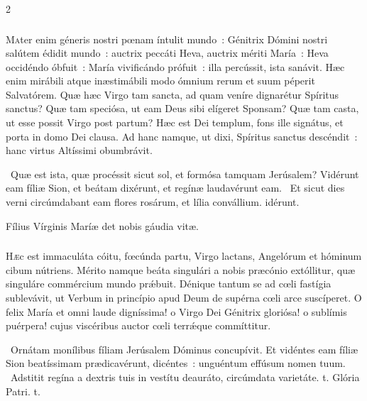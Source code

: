 \documentclass[9pt,twoside]{extarticle}
\begin{document}
\begin{multicols}{2}
{\subsubsection*{\center {}}
\lettrine{M}ater enim géneris nostri pœnam íntulit mundo~: Génitrix Dómini nostri salútem édidit mundo~: auctrix peccáti Heva, auctrix mériti María~: Heva occidéndo óbfuit~: María vivificándo prófuit~: illa percússit, ista sanávit. Hæc enim mirábili atque inæstimábili modo ómnium rerum et suum péperit Salvatórem. Quæ hæc Virgo tam sancta, ad quam veníre dignarétur Spíritus sanctus? Quæ tam speciósa, ut eam Deus sibi elígeret Sponsam? Quæ tam casta, ut esse possit Virgo post partum? Hæc est Dei templum, fons ille signátus, et porta in domo Dei clausa. Ad hanc namque, ut dixi, Spíritus sanctus descéndit~: hanc virtus Altíssimi obumbrávit.

\begin{tightlist}{}
\item {}~Quæ est ista, quæ procéssit sicut sol, et formósa tamquam Jerúsalem? \textred{*} Vidérunt eam fíliæ Sion, et beátam dixérunt, et regínæ laudavérunt eam.
~Et sicut dies verni circúmdabant eam flores rosárum, et lília convállium. idérunt.
\item {\small {} Fílius Vírginis Maríæ det nobis gáudia vitæ.}
\end{tightlist}

\subsubsection*{\center {}}
\lettrine{H}æc est immaculáta cóitu, fœcúnda partu, Virgo lactans, Angelórum et hóminum cibum nútriens. Mérito namque beáta singulári a nobis præcónio extóllitur, quæ singuláre commércium mundo prǽbuit. Dénique tantum se ad cœli fastígia sublevávit, ut Verbum in princípio apud Deum de supérna cœli arce suscíperet. O felix María et omni laude digníssima! o Virgo Dei Génitrix gloriósa! o sublímis puérpera! cujus viscéribus auctor cœli terrǽque commíttitur.

\begin{tightlist}{}
\item {}~Ornátam monílibus fíliam Jerúsalem Dóminus concupívit. \textred{*} Et vidéntes eam fíliæ Sion beatíssimam prædicavérunt, dicéntes~: unguéntum effúsum nomen tuum.
~Adstitit regína a dextris tuis in vestítu deauráto, circúmdata varietáte. t. Glória Patri. t.
\end{tightlist}

}
\end{multicols}
\end{document}
